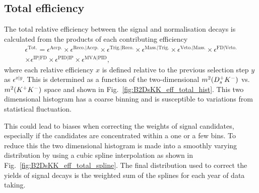\subsection{Total efficiency}
The total relative efficiency between the signal and normalisation decays is calculated from the products of each contributing efficiency
\begin{multline}
\epsilon^\text{Tot.} = \epsilon^{\text{Accp.}} \times \epsilon^{\text{Reco.}|\text{Accp.}} \times \epsilon^{\text{Trig.}|\text{Reco.}}\times \epsilon^{\text{Mass.}|\text{Trig.}}\times \epsilon^{\text{Veto.}|\text{Mass.}}\times \epsilon^{\text{FD}|\text{Veto.}}\\
\times \epsilon^{\text{IP}|\text{FD}} \times \epsilon^{\text{PID}|\text{IP}} \times \epsilon^{\text{MVA}|\text{PID}},
\label{eq:B2DsPhi_eff_eq}
\end{multline}
where each relative efficiency $x$ is defined relative to the previous selection step $y$ as $\epsilon^{x|y}$. This is determined as a function of the two-dimensional $m^{2}({{D}^+_{s}}{{K}^-})$ vs. $m^{2}({{K}^+}{{K}^-})$ space and shown in Fig.~\ref{fig:B2DsKK_eff_total_hist}. This two dimensional histogram has a coarse binning and is susceptible to variations from statistical fluctuation.  

This could lead to biases when correcting the weights of signal candidates, especially if the candidates are concentrated within a one or a few bins. To reduce this the two dimensional histogram is made into a smoothly varying distribution by using a cubic spline interpolation as shown in Fig.~\ref{fig:B2DsKK_eff_total_spline}. The final distribution used to correct the yields of signal decays is the weighted sum of the splines for each year of data taking.


